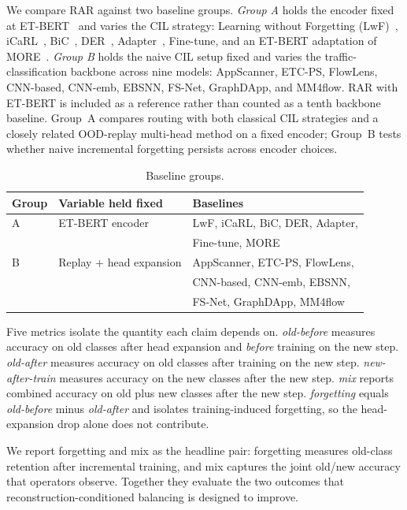 We compare RAR against two baseline groups. \emph{Group A} holds the encoder fixed at ET-BERT~\cite{lin2022etbert} and varies the CIL strategy: Learning without Forgetting (LwF)~\cite{li2017lwf}, iCaRL~\cite{rebuffi2017icarl}, BiC~\cite{wu2019bic}, DER~\cite{yan2021der}, Adapter~\cite{houlsby2019adapter}, Fine-tune, and an ET-BERT adaptation of MORE~\cite{kim2022more}. \emph{Group B} holds the naive CIL setup fixed and varies the traffic-classification backbone across nine models: AppScanner, ETC-PS, FlowLens, CNN-based, CNN-emb, EBSNN, FS-Net, GraphDApp, and MM4flow. RAR with ET-BERT is included as a reference rather than counted as a tenth backbone baseline. Group~A compares routing with both classical CIL strategies and a closely related OOD-replay multi-head method on a fixed encoder; Group~B tests whether naive incremental forgetting persists across encoder choices.

\begin{table}[t]
\caption{Baseline groups.}
\label{tab:baselines}
\centering
\small
\begin{tabular}{lll}
\toprule
Group & Variable held fixed & Baselines \\
\midrule
A & ET-BERT encoder & LwF, iCaRL, BiC, DER, Adapter,\\
  &                   & Fine-tune, MORE \\
B & Replay + head expansion & AppScanner, ETC-PS, FlowLens,\\
  &                        & CNN-based, CNN-emb, EBSNN,\\
  &                        & FS-Net, GraphDApp, MM4flow \\
\bottomrule
\end{tabular}
\end{table}

Five metrics isolate the quantity each claim depends on. \emph{old-before} measures accuracy on old classes after head expansion and \emph{before} training on the new step. \emph{old-after} measures accuracy on old classes after training on the new step. \emph{new-after-train} measures accuracy on the new classes after the new step. \emph{mix} reports combined accuracy on old plus new classes after the new step. \emph{forgetting} equals \emph{old-before} minus \emph{old-after} and isolates training-induced forgetting, so the head-expansion drop alone does not contribute.

We report forgetting and mix as the headline pair: forgetting measures old-class retention after incremental training, and mix captures the joint old/new accuracy that operators observe. Together they evaluate the two outcomes that reconstruction-conditioned balancing is designed to improve.

